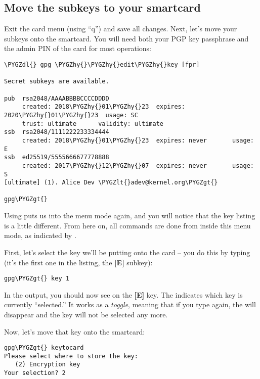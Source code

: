 \documentclass[a4paper,8pt,english]{sphinxmanual}
\def\PYGZlt{\char`\<}
\def\PYGZgt{\char`\>}
\def\PYGZdl{\char`\$}
\def\PYGZhy{\char`\-}
\begin{document}
\subsection{Move the subkeys to your smartcard}
\label{process/maintainer-pgp-guide:move-the-subkeys-to-your-smartcard}
Exit the card menu (using ``q'') and save all changes. Next, let's move
your subkeys onto the smartcard. You will need both your PGP key
passphrase and the admin PIN of the card for most operations:

\begin{Verbatim}[commandchars=\\\{\}]
\PYGZdl{} gpg \PYGZhy{}\PYGZhy{}edit\PYGZhy{}key [fpr]

Secret subkeys are available.

pub  rsa2048/AAAABBBBCCCCDDDD
     created: 2018\PYGZhy{}01\PYGZhy{}23  expires: 2020\PYGZhy{}01\PYGZhy{}23  usage: SC
     trust: ultimate      validity: ultimate
ssb  rsa2048/1111222233334444
     created: 2018\PYGZhy{}01\PYGZhy{}23  expires: never       usage: E
ssb  ed25519/5555666677778888
     created: 2017\PYGZhy{}12\PYGZhy{}07  expires: never       usage: S
[ultimate] (1). Alice Dev \PYGZlt{}adev@kernel.org\PYGZgt{}

gpg\PYGZgt{}
\end{Verbatim}

Using  puts us into the menu mode again, and you will
notice that the key listing is a little different. From here on, all
commands are done from inside this menu mode, as indicated by .

First, let's select the key we'll be putting onto the card -- you do
this by typing  (it's the first one in the listing, the \textbf{{[}E{]}}
subkey):

\begin{Verbatim}[commandchars=\\\{\}]
gpg\PYGZgt{} key 1
\end{Verbatim}

In the output, you should now see  on the \textbf{{[}E{]}} key. The \code{*}
indicates which key is currently ``selected.'' It works as a \emph{toggle},
meaning that if you type  again, the \code{*} will disappear and
the key will not be selected any more.

Now, let's move that key onto the smartcard:

\begin{Verbatim}[commandchars=\\\{\}]
gpg\PYGZgt{} keytocard
Please select where to store the key:
   (2) Encryption key
Your selection? 2
\end{Verbatim}
\end{document}
